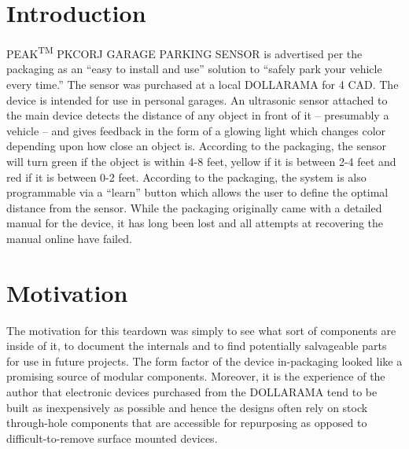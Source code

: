 \documentclass[journal]{IEEEtran}
\begin{document}
\IEEEpeerreviewmaketitle

\section{Introduction}
% 
% 
% 
% 
 PEAK\textsuperscript{TM} PKCORJ GARAGE PARKING SENSOR is advertised per the packaging as an 
``easy to install and use'' solution to ``safely park your vehicle every time.'' The sensor was purchased at a local 
DOLLARAMA for 4 CAD. The device is intended for use in personal garages. An ultrasonic sensor attached to the main device detects the distance of any object in front of it -- presumably a vehicle -- and gives feedback in the form of a glowing light which changes color 
depending upon how close an object is. According to the packaging, the sensor will turn green if the object is within 4-8 feet, 
yellow if it is between 2-4 feet and red if it is between 0-2 feet. According to the packaging, the system is also 
programmable via a ``learn'' button which allows the user to define the optimal distance from the sensor. While the packaging 
originally came with a detailed manual for the device, it has long been lost and all attempts at recovering the manual online 
have failed. 

\section{Motivation}
The motivation for this teardown was simply to see what sort of components are inside of it, to document 
the internals and to find potentially salvageable parts for use in future projects. The form factor of 
the device in-packaging looked like a promising source of modular components. Moreover, it is the experience
of the author that electronic devices purchased from the DOLLARAMA tend to be built as inexpensively as possible 
and hence the designs often rely on stock through-hole components that are accessible for repurposing as opposed
to difficult-to-remove surface mounted devices.   
\end{document}
